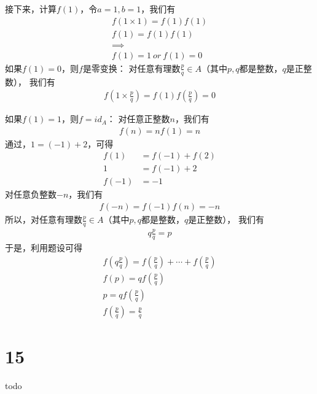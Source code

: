 \documentclass{article}
\begin{document}
\begin{itemize}
            接下来，计算$f(1)$，令$a = 1, b = 1$，我们有
            \begin{align*}
                  f(1 \times 1) = f(1) f(1) \\
                  f(1) = f(1) f(1)          \\
                  \implies                  \\
                  f(1) = 1 \ or \ f(1) = 0
            \end{align*}
            如果$f(1) = 0$，则$f$是零变换：
            对任意有理数$\frac{p}{q} \in A$（其中$p, q$都是整数，$q$是正整数），
            我们有
            \begin{align*}
                  f(1 \times \frac{p}{q}) = f(1)  f(\frac{p}{q}) = 0
            \end{align*}

            如果$f(1) = 1$，则$f = id_A$：
            对任意正整数$n$，我们有
            \begin{align*}
                  f(n) = n f(1) = n
            \end{align*}
            通过，$1 = (-1) + 2$，可得
            \begin{align*}
                  f(1)  & = f(-1) + f(2) \\
                  1     & = f(-1) + 2    \\
                  f(-1) & = -1
            \end{align*}
            对任意负整数$-n$，我们有
            \begin{align*}
                  f(-n) = f(-1) f(n) = -n
            \end{align*}
            所以，对任意有理数$\frac{p}{q} \in A$（其中$p, q$都是整数，$q$是正整数），
            我们有
            \begin{align*}
                  q \frac{p}{q} = p
            \end{align*}
            于是，利用题设可得
            \begin{align*}
                  f(q \frac{p}{q}) = f(\frac{p}{q}) + \cdots + f(\frac{p}{q}) \\
                  f(p) = q f(\frac{p}{q})                                     \\
                  p = q f(\frac{p}{q})                                        \\
                  f(\frac{p}{q}) = \frac{p}{q}
            \end{align*}
\end{itemize}

\section*{15}

todo 
\end{document}
